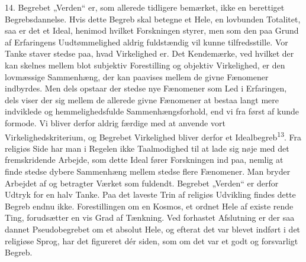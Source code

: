 \documentclass[12pt,a4paper,openany]{book}
\newcommand{\opage}[1]{\marginnote{\footnotesize\textit{[#1]}}}
\begin{document}
14. Begrebet „Verden“ er, som allerede tidligere bemærket, ikke en
berettiget Begrebsdannelse. Hvis dette Begreb skal betegne et Hele, en
lovbunden Totalitet, saa er det et Ideal, henimod hvilket Forskningen
styrer, men som den paa Grund af Erfaringens Uudtømmelighed aldrig
fuldstændig vil kunne tilfredsstille. Vor Tanke staver stedse paa, hvad
Virkelighed er. Det Kendemærke, ved hvilket der kan skelnes mellem blot
subjektiv Forestilling og objektiv Virkelighed, er den lovmæssige
Sammenhæng, der kan paavises mellem de givne Fænomener indbyrdes. Men
dels opstaar der stedse nye Fænomener som Led i Erfaringen, dels viser
der sig mellem de allerede givne Fænomener at bestaa langt mere
indviklede og hemmelighedsfulde Sammenhængsforhold, end vi fra først af
kunde formode. Vi bliver derfor aldrig færdige med at anvende vort
Virkelighedskriterium, og Begrebet Virkelighed bliver derfor et
Idealbegreb\textsuperscript{13}. Fra religiøs Side har man i Regelen
ikke Taalmodighed til at lade sig nøje med det fremskridende Arbejde,
som dette Ideal fører Forskningen ind paa, nemlig at finde stedse dybere
Sammenhæng mellem stedse flere Fænomener. Man bryder Arbejdet af og
betragter Værket som fuldendt. Begrebet „Verden“ er derfor Udtryk for en
halv Tanke. Paa det laveste Trin af religiøs Udvikling findes dette
Begreb endnu ikke. Forestillingen om en Kosmos, et ordnet Hele af
existe%
\opage{37}rende Ting, forudsætter en vis Grad af Tænkning. Ved forhastet
Afslutning er der saa dannet Pseudobegrebet om et absolut Hele, og
efterat det var blevet indført i det religiøse Sprog, har det figureret
dér siden, som om det var et godt og forsvarligt Begreb.
\end{document}
